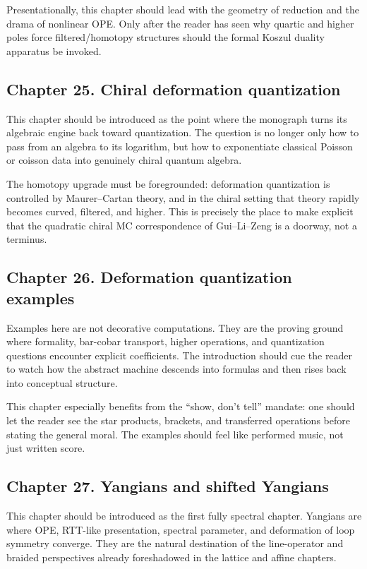 Presentationally, this chapter should lead with the geometry of reduction and the drama of nonlinear OPE.  Only after the reader has seen why quartic and higher poles force filtered/homotopy structures should the formal Koszul duality apparatus be invoked.

\subsection*{Chapter 25. Chiral deformation quantization}
This chapter should be introduced as the point where the monograph turns its algebraic engine back toward quantization.  The question is no longer only how to pass from an algebra to its logarithm, but how to exponentiate classical Poisson or coisson data into genuinely chiral quantum algebra.

The homotopy upgrade must be foregrounded: deformation quantization is controlled by Maurer--Cartan theory, and in the chiral setting that theory rapidly becomes curved, filtered, and higher.  This is precisely the place to make explicit that the quadratic chiral MC correspondence of Gui--Li--Zeng is a doorway, not a terminus.

\subsection*{Chapter 26. Deformation quantization examples}
Examples here are not decorative computations.  They are the proving ground where formality, bar-cobar transport, higher operations, and quantization questions encounter explicit coefficients.  The introduction should cue the reader to watch how the abstract machine descends into formulas and then rises back into conceptual structure.

This chapter especially benefits from the ``show, don't tell'' mandate: one should let the reader see the star products, brackets, and transferred operations before stating the general moral.  The examples should feel like performed music, not just written score.

\subsection*{Chapter 27. Yangians and shifted Yangians}
This chapter should be introduced as the first fully spectral chapter.  Yangians are where OPE, RTT-like presentation, spectral parameter, and deformation of loop symmetry converge.  They are the natural destination of the line-operator and braided perspectives already foreshadowed in the lattice and affine chapters.

